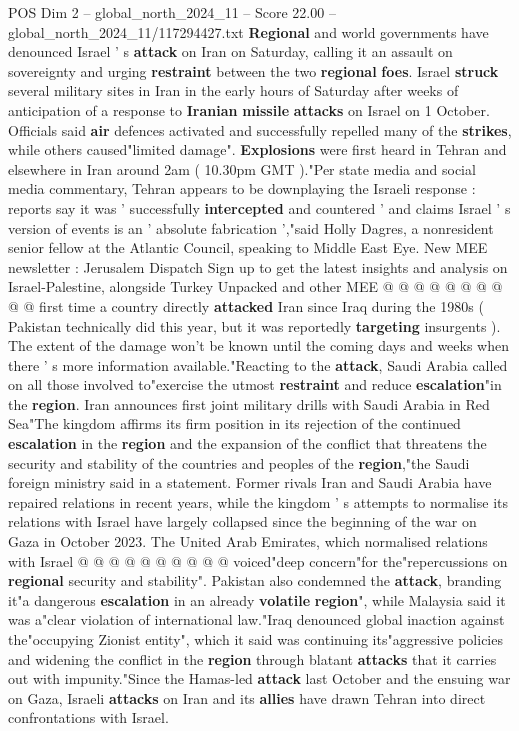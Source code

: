 \begin{textsample}{POS Dim 2 – global\_north\_2024\_11 – Score 22.00 – global\_north\_2024\_11/117294427.txt}  \label{ex:f2_pos_256}
\textbf{Regional} and world governments have denounced Israel ' s \textbf{attack} on Iran on Saturday, calling it an assault on sovereignty and urging \textbf{restraint} between the two \textbf{regional} \textbf{foes}.
Israel \textbf{struck} several military sites in Iran in the early hours of Saturday after weeks of anticipation of a response to \textbf{Iranian} \textbf{missile} \textbf{attacks} on Israel on 1 October.
Officials said \textbf{air} defences activated and successfully repelled many of the \textbf{strikes}, while others caused"limited damage". \textbf{Explosions} were first heard in Tehran and elsewhere in Iran around 2am ( 10.30pm GMT )."Per state media and social media commentary, Tehran appears to be downplaying the Israeli response : reports say it was ' successfully \textbf{intercepted} and countered ' and claims Israel ' s version of events is an ' absolute fabrication ',"said Holly Dagres, a nonresident senior fellow at the Atlantic Council, speaking to Middle East Eye.
New MEE newsletter : Jerusalem Dispatch Sign up to get the latest insights and analysis on Israel-Palestine, alongside Turkey Unpacked and other MEE @ @ @ @ @ @ @ @ @ @ first time a country directly \textbf{attacked} Iran since Iraq during the 1980s ( Pakistan technically did this year, but it was reportedly \textbf{targeting} insurgents ).
The extent of the damage won't be known until the coming days and weeks when there ' s more information available."Reacting to the \textbf{attack}, Saudi Arabia called on all those involved to"exercise the utmost \textbf{restraint} and reduce \textbf{escalation}"in the \textbf{region}.
Iran announces first joint military drills with Saudi Arabia in Red Sea"The kingdom affirms its firm position in its rejection of the continued \textbf{escalation} in the \textbf{region} and the expansion of the conflict that threatens the security and stability of the countries and peoples of the \textbf{region},"the Saudi foreign ministry said in a statement.
Former rivals Iran and Saudi Arabia have repaired relations in recent years, while the kingdom ' s attempts to normalise its relations with Israel have largely collapsed since the beginning of the war on Gaza in October 2023.
The United Arab Emirates, which normalised relations with Israel @ @ @ @ @ @ @ @ @ @ voiced"deep concern"for the"repercussions on \textbf{regional} security and stability".
Pakistan also condemned the \textbf{attack}, branding it"a dangerous \textbf{escalation} in an already \textbf{volatile} \textbf{region}", while Malaysia said it was a"clear violation of international law."Iraq denounced global inaction against the"occupying Zionist entity", which it said was continuing its"aggressive policies and widening the conflict in the \textbf{region} through blatant \textbf{attacks} that it carries out with impunity."Since the Hamas-led \textbf{attack} last October and the ensuing war on Gaza, Israeli \textbf{attacks} on Iran and its \textbf{allies} have drawn Tehran into direct confrontations with Israel.

\end{textsample}
